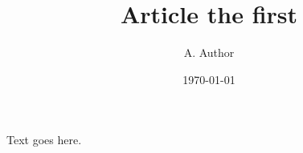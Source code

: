 \documentclass[12pt]{article}
\title{Article the first}
\author{A. Author}
\date{\today}
\begin{document}
   Text goes here.
\end{document}
